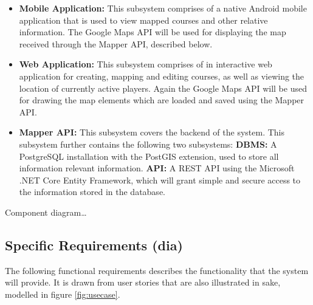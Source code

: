 \documentclass{article}
\begin{document}
    \begin{itemize}
        \item \textbf{Mobile Application:} This subsystem comprises of a native
            Android mobile application that is used to view mapped courses and
            other relative information. The Google Maps API will be used for
            displaying the map received through the Mapper API, described
            below.
        \item \textbf{Web Application:} This subsystem comprises of in
            interactive web application for creating, mapping and editing
            courses, as well as viewing the location of currently active
            players. Again the Google Maps API will be used for drawing the map
            elements which are loaded and saved using the Mapper API.
        \item \textbf{Mapper API:} This subsystem covers the backend of the
            system. This subsystem further contains the following two
            subsystems:
            \subitem \textbf{DBMS:} A PostgreSQL installation with the PostGIS
            extension, used to store all information relevant information.
            \subitem \textbf{API:} A REST API using the Microsoft .NET Core
            Entity Framework, which will grant simple and secure access to the
            information stored in the database.
    \end{itemize}

    Component diagram\ldots

    \subsection{Specific Requirements (dia)}
    \label{sec:requirements}

    The following functional requirements describes the functionality that the
    system will provide. It is drawn from user stories that are also
    illustrated in sake, modelled in figure \ref{fig:usecase}.
\end{document}
